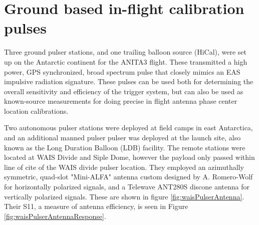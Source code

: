 \section{Ground based in-flight calibration pulses}
	Three ground pulser stations, and one trailing balloon source (HiCal), were set up on the Antarctic continent for the ANITA3 flight.  These transmitted a high power, GPS synchronized, broad spectrum pulse that closely mimics an EAS impulsive radiation signature.  These pulses can be used both for determining the overall sensitivity and efficiency of the trigger system, but can also be used as known-source measurements for doing precise in flight antenna phase center location calibrations.
	
	Two autonomous pulser stations were deployed at field camps in east Antarctica, and an additional manned pulser pulser was deployed at the launch site, also known as the Long Duration Balloon (LDB) facility.  The remote stations were located at WAIS Divide and Siple Dome, however the payload only passed within line of cite of the WAIS divide pulser location.  They employed an azimuthally symmetric, quad-slot "Mini-ALFA" antenna custom designed by A. Romero-Wolf for horizontally polarized signals, and a Telewave ANT280S discone antenna for vertically polarized signals.  These are shown in figure \ref{fig:waisPulserAntenna}.  Their S11, a measure of antenna efficiency, is seen in Figure \ref{fig:waisPulserAntennaResponse}. 
	
